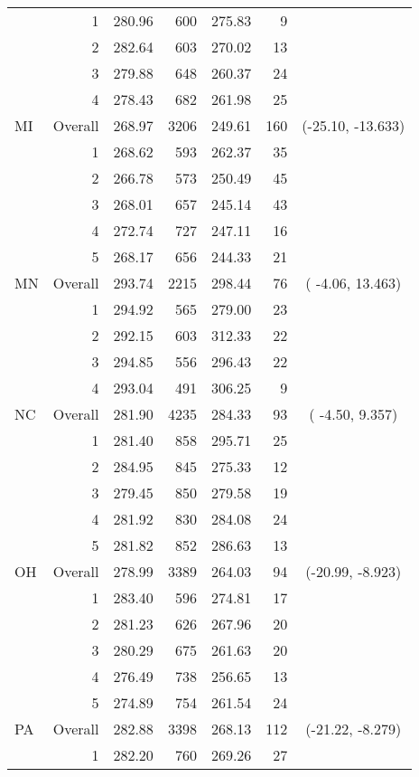 \begin{longtable}{lrrr@{\extracolsep{.25cm}}rrc}
   & 1 & 280.96 & 600 & 275.83 &   9 &  \\ 
   & 2 & 282.64 & 603 & 270.02 &  13 &  \\ 
   & 3 & 279.88 & 648 & 260.37 &  24 &  \\ 
   & 4 & 278.43 & 682 & 261.98 &  25 &  \\ 
   \hline
MI & Overall & 268.97 & 3206 & 249.61 & 160 & (-25.10, -13.633) \\ 
   & 1 & 268.62 & 593 & 262.37 &  35 &  \\ 
   & 2 & 266.78 & 573 & 250.49 &  45 &  \\ 
   & 3 & 268.01 & 657 & 245.14 &  43 &  \\ 
   & 4 & 272.74 & 727 & 247.11 &  16 &  \\ 
   & 5 & 268.17 & 656 & 244.33 &  21 &  \\ 
   \hline
MN & Overall & 293.74 & 2215 & 298.44 &  76 & ( -4.06,  13.463) \\ 
   & 1 & 294.92 & 565 & 279.00 &  23 &  \\ 
   & 2 & 292.15 & 603 & 312.33 &  22 &  \\ 
   & 3 & 294.85 & 556 & 296.43 &  22 &  \\ 
   & 4 & 293.04 & 491 & 306.25 &   9 &  \\ 
   \hline
NC & Overall & 281.90 & 4235 & 284.33 &  93 & ( -4.50,   9.357) \\ 
   & 1 & 281.40 & 858 & 295.71 &  25 &  \\ 
   & 2 & 284.95 & 845 & 275.33 &  12 &  \\ 
   & 3 & 279.45 & 850 & 279.58 &  19 &  \\ 
   & 4 & 281.92 & 830 & 284.08 &  24 &  \\ 
   & 5 & 281.82 & 852 & 286.63 &  13 &  \\ 
   \hline
OH & Overall & 278.99 & 3389 & 264.03 &  94 & (-20.99,  -8.923) \\ 
   & 1 & 283.40 & 596 & 274.81 &  17 &  \\ 
   & 2 & 281.23 & 626 & 267.96 &  20 &  \\ 
   & 3 & 280.29 & 675 & 261.63 &  20 &  \\ 
   & 4 & 276.49 & 738 & 256.65 &  13 &  \\ 
   & 5 & 274.89 & 754 & 261.54 &  24 &  \\ 
   \hline
PA & Overall & 282.88 & 3398 & 268.13 & 112 & (-21.22,  -8.279) \\ 
   & 1 & 282.20 & 760 & 269.26 &  27 &  \\ 

\end{longtable}
